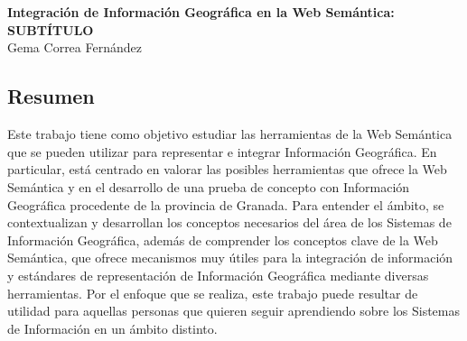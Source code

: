 \chapter*{}
\thispagestyle{empty}






\cleardoublepage
\thispagestyle{empty}

\begin{center} 
	\large{\textbf{Integración de Información Geográfica en la Web Semántica:\\ SUBTÍTULO}}\\
	\vspace{0.25in}
	Gema Correa Fernández
\end{center}


\section*{Resumen}


Este trabajo tiene como objetivo estudiar las herramientas de la Web Semántica que se pueden utilizar para representar e integrar Información Geográfica. En particular, está centrado en valorar las posibles herramientas que ofrece la Web Semántica y en el desarrollo de una prueba de concepto con Información Geográfica procedente de la provincia de Granada. Para entender el ámbito, se contextualizan y desarrollan los conceptos necesarios del área de los Sistemas de Información Geográfica, además de comprender los conceptos clave de la Web Semántica, que ofrece mecanismos muy útiles para la integración de información y estándares de representación de Información Geográfica mediante diversas herramientas. Por el enfoque que se realiza, este trabajo puede resultar de utilidad para aquellas personas que quieren seguir aprendiendo sobre los Sistemas de Información en un ámbito distinto.

